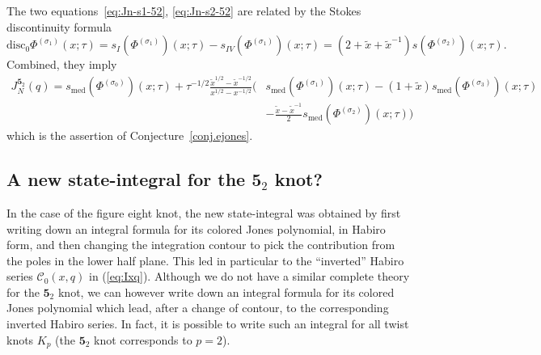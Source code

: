 \documentclass[12pt,reqno]{amsart}
\theoremstyle{definition}
\def\s{\sigma}
\def\tx{\tilde{x}}
\def\tx{\tilde{x}}
\def\mc{\mathcal}
\def\md{\mathbf}
\newcommand{\knot}[1]{\md{#1}}
\newcommand{\nn}{\nonumber \\}
\begin{document}
  The two equations~\eqref{eq:Jn-s1-52}, \eqref{eq:Jn-s2-52} are related by
  the Stokes discontinuity formula
  \begin{equation}
    \text{disc}_0 \Phi^{(\s_1)}(x;\tau) =
    s_I(\Phi^{(\s_1)})(x;\tau) - s_{IV}(\Phi^{(\s_1)})(x;\tau)= 
    (2+\tx+\tx^{-1}) s(\Phi^{(\s_2)})(x;\tau).
  \end{equation}
Combined, they imply 
\begin{align}
\label{52ejones}
  J_N^{\knot{5}_2}(q) =
  s_{\text{med}}(\Phi^{(\s_0)})(x;\tau)+\tau^{-1/2}
  \frac{\tx^{1/2}-\tx^{-1/2}}{x^{1/2}-x^{-1/2}} %
  \big(
  &s_{\text{med}}(\Phi^{(\s_1)})(x;\tau)
    -(1+\tx)s_{\text{med}}(\Phi^{(\s_3)})(x;\tau)\nn
  &-\frac{\tx-\tx^{-1}}{2}s_{\text{med}}(\Phi^{(\s_2)})(x;\tau)
    \big) 
\end{align}
which is the assertion of Conjecture~\ref{conj.ejones}.


\subsection{A new state-integral for the ${\knot{5}_2}$ knot?}
\label{sec:newstateint}

In the case of the figure eight knot, the new state-integral was obtained by first 
writing down an integral formula for its colored Jones polynomial, in Habiro form,
and then changing the integration contour to pick the contribution from the poles
in the lower half plane. This led in particular to the ``inverted'' Habiro series
$\mc{C}_0(x,q)$ in (\ref{eq:Ixq}). Although we do not have a similar complete
theory for the ${\knot{5}_2}$ knot, we can however write down an integral formula
for its colored Jones polynomial which lead, after a change of contour, to the
corresponding inverted Habiro series. In fact, it is possible to write such an
integral for all twist knots $K_p$ (the ${\knot{5}_2}$ knot corresponds to $p=2$). 
\end{document}
